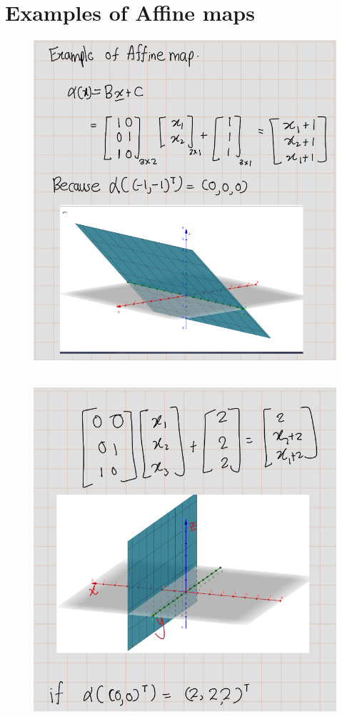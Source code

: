 \documentclass[
]{book}
\theoremstyle{definition}
\theoremstyle{definition}
\theoremstyle{definition}
\theoremstyle{definition}
\theoremstyle{remark}
\begin{document}
\hypertarget{examples-of-affine-maps}{%
\chapter{Examples of Affine maps}\label{examples-of-affine-maps}}

\begin{figure}
\centering
\includegraphics{figures/Examples/fig1.png}
\caption{\label{fig:fige01}\(~\)}
\end{figure}

\begin{figure}
\centering
\includegraphics{figures/Examples/fig2.png}
\caption{\label{fig:fige02}\(~\)}
\end{figure}
\end{document}
